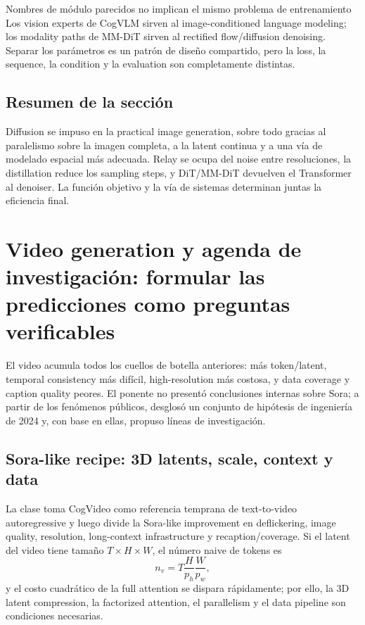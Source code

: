 \documentclass[a4paper]{article}
\begin{document}
\begin{warningbox}{Nombres de módulo parecidos no implican el mismo problema de entrenamiento}
Los vision experts de CogVLM sirven al image-conditioned language modeling; los modality paths de MM-DiT sirven al rectified flow/diffusion denoising. Separar los parámetros es un patrón de diseño compartido, pero la loss, la sequence, la condition y la evaluation son completamente distintas.
\end{warningbox}

\subsection{Resumen de la sección}

Diffusion se impuso en la practical image generation, sobre todo gracias al paralelismo sobre la imagen completa, a la latent continua y a una vía de modelado espacial más adecuada. Relay se ocupa del noise entre resoluciones, la distillation reduce los sampling steps, y DiT/MM-DiT devuelven el Transformer al denoiser. La función objetivo y la vía de sistemas determinan juntas la eficiencia final.
\section{Video generation y agenda de investigación: formular las predicciones como preguntas verificables}

El video acumula todos los cuellos de botella anteriores: más token/latent, temporal consistency más difícil, high-resolution más costosa, y data coverage y caption quality peores. El ponente no presentó conclusiones internas sobre Sora; a partir de los fenómenos públicos, desglosó un conjunto de hipótesis de ingeniería de 2024 y, con base en ellas, propuso líneas de investigación.

\subsection{Sora-like recipe: 3D latents, scale, context y data}

La clase toma CogVideo como referencia temprana de text-to-video autoregressive y luego divide la Sora-like improvement en deflickering, image quality, resolution, long-context infrastructure y recaption/coverage. Si el latent del video tiene tamaño $T\times H\times W$, el número naive de tokens es
\[
n_v=T\frac{H}{p_h}\frac{W}{p_w},
\]
y el costo cuadrático de la full attention se dispara rápidamente; por ello, la 3D latent compression, la factorized attention, el parallelism y el data pipeline son condiciones necesarias.
\end{document}
